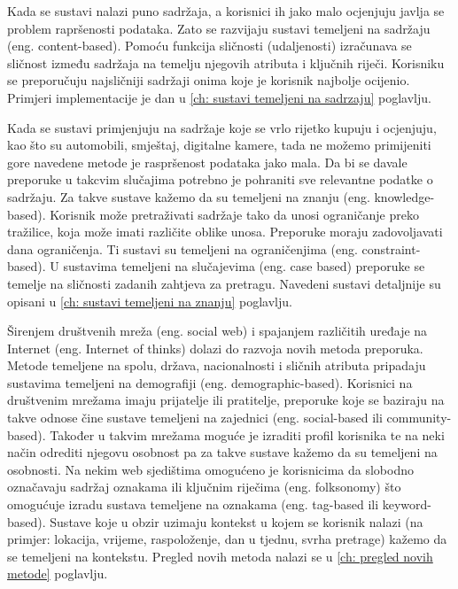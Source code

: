 \documentclass[a4paper,oneside,12pt]{memoir} %
\begin{document}
\par
Kada se sustavi nalazi puno sadržaja, a korisnici ih jako malo ocjenjuju javlja se problem rapršenosti podataka. Zato se razvijaju sustavi temeljeni na sadržaju (eng. content-based). Pomoću funkcija sličnosti (udaljenosti) izračunava se sličnost između sadržaja na temelju njegovih atributa i ključnih riječi. Korisniku se preporučuju najsličniji sadržaji onima koje je korisnik najbolje ocijenio. Primjeri implementacije je dan u \ref{ch: sustavi temeljeni na sadrzaju} poglavlju.
\par
Kada se sustavi primjenjuju na sadržaje koje se vrlo rijetko kupuju i ocjenjuju, kao što su automobili, smještaj, digitalne kamere, tada ne možemo primijeniti gore navedene metode je raspršenost podataka jako mala. Da bi se davale preporuke u takcvim slučajima potrebno je pohraniti sve relevantne podatke o sadržaju. Za takve sustave kažemo da su temeljeni na znanju (eng. knowledge-based). Korisnik može pretraživati sadržaje tako da unosi ograničanje preko tražilice, koja može imati različite oblike unosa. Preporuke moraju zadovoljavati dana ograničenja. Ti sustavi su temeljeni na ograničenjima (eng. constraint-based). U sustavima temeljeni na slučajevima (eng. case based) preporuke se temelje na sličnosti zadanih zahtjeva za pretragu. Navedeni sustavi detaljnije su opisani u \ref{ch: sustavi temeljeni na znanju} poglavlju.
\par
Širenjem društvenih mreža (eng. social web) i spajanjem različitih uređaje na Internet (eng. Internet of thinks) dolazi do razvoja novih metoda preporuka. Metode temeljene na spolu, država, nacionalnosti i sličnih atributa pripadaju sustavima temeljeni na demografiji (eng. demographic-based). Korisnici na društvenim mrežama imaju prijatelje ili pratitelje, preporuke koje se baziraju na takve odnose čine sustave temeljeni na zajednici (eng. social-based ili community-based). Također u takvim mrežama moguće je izraditi profil korisnika te na neki način odrediti njegovu osobnost pa za takve sustave kažemo da su temeljeni na osobnosti. Na nekim web sjedištima omogućeno je korisnicima da slobodno označavaju sadržaj oznakama ili ključnim riječima (eng. folksonomy) što omogućuje izradu sustava temeljene na oznakama (eng. tag-based ili keyword-based). Sustave koje u obzir uzimaju kontekst u kojem se korisnik nalazi (na primjer: lokacija, vrijeme, raspoloženje, dan u tjednu, svrha pretrage) kažemo da se temeljeni na kontekstu. Pregled novih metoda nalazi se u \ref{ch: pregled novih metode} poglavlju.
\end{document}
